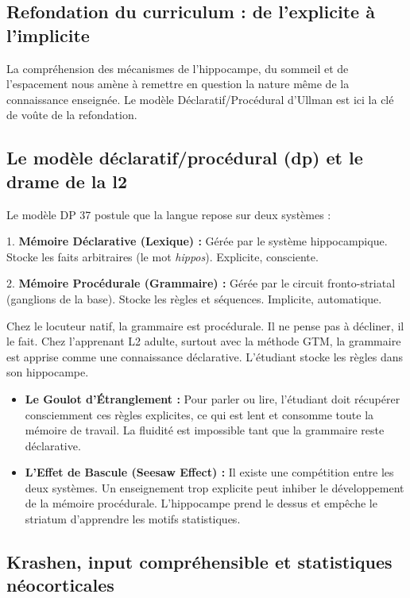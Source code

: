 \subsection{Refondation du curriculum : de l'explicite à l'implicite}

La compréhension des mécanismes de l'hippocampe, du sommeil et de l'espacement nous amène à remettre
en question la nature même de la connaissance enseignée. Le modèle Déclaratif/Procédural d'Ullman
est ici la clé de voûte de la refondation.



\subsection{Le modèle déclaratif/procédural (dp) et le drame de la l2}

Le modèle DP 37 postule que la langue repose sur deux systèmes :

1. \textbf{Mémoire Déclarative (Lexique) :} Gérée par le système hippocampique. Stocke les faits
arbitraires (le mot \textit{hippos}). Explicite, consciente.

2. \textbf{Mémoire Procédurale (Grammaire) :} Gérée par le circuit fronto-striatal (ganglions de la
base). Stocke les règles et séquences. Implicite, automatique.

Chez le locuteur natif, la grammaire est procédurale. Il ne \og pense\fg{} pas à décliner, il le
fait. Chez l'apprenant L2 adulte, surtout avec la méthode GTM, la grammaire est apprise comme une
connaissance déclarative. L'étudiant stocke les règles dans son hippocampe.

\begin{itemize}\item \textbf{Le Goulot d'Étranglement :} Pour parler ou lire, l'étudiant doit récupérer consciemment ces règles explicites, ce qui est lent et consomme toute la mémoire de travail.\cite{III-3-1-ref40} La fluidité est impossible tant que la grammaire reste déclarative.\item \textbf{L'Effet de Bascule (Seesaw Effect) :} Il existe une compétition entre les deux systèmes. Un enseignement trop explicite peut inhiber le développement de la mémoire procédurale. L'hippocampe \og prend le dessus\fg{} et empêche le striatum d'apprendre les motifs statistiques.\cite{III-3-1-ref39}\end{itemize}

\subsection{Krashen, input compréhensible et statistiques néocorticales}

